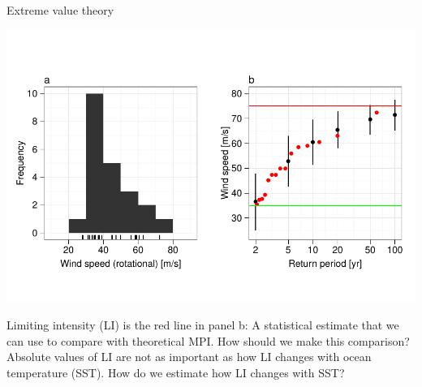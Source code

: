 \documentclass[handout]{beamer}
\begin{document}
\begin{frame}{Extreme value theory}
\vspace{-1cm}
\begin{center}
\includegraphics[scale=.65]{figures/LimitingIntensity0.pdf}
\end{center}
\vspace{-.75cm}
\alert{Limiting intensity (LI)} is the red line in panel b: A statistical estimate that we can use to compare with theoretical MPI. How should we make this comparison? Absolute values of LI are not as important as how LI changes with ocean temperature (SST). How do we estimate how LI changes with SST?
\end{frame}
\end{document}

